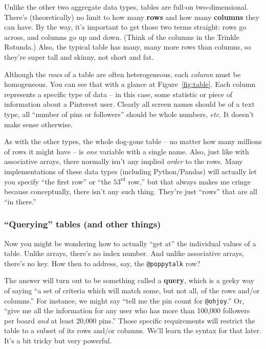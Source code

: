 Unlike the other two aggregate data types, tables are full-on two-dimensional.
There's (theoretically) no limit to how many \textbf{rows} and how many
\textbf{columns} they can have. By the way, it's important to get those two
terms straight: rows go across, and columns go up and down. (Think of the
columns in the Trinkle Rotunda.) Also, the typical table has many, many more
rows than columns, so they're super tall and skinny, not short and fat.

Although the \textit{rows} of a table are often heterogeneous, each
\textit{column} must be homogeneous. You can see that with a glance at
Figure~\ref{fig:table}. Each column represents a specific type of data -- in
this case, some statistic or piece of information about a Pinterest user.
Clearly all screen names should be of a text type, all ``number of pins or
followers'' should be whole numbers, \textit{etc.} It doesn't make sense
otherwise.

\label{assocArraysUnordered}
As with the other types, the whole dog-gone table -- no matter how many
millions of rows it might have -- is \textit{one} variable with a single name.
Also, just like with associative arrays, there normally isn't any implied
\textit{order} to the rows. Many implementations of these data types (including
Python/Pandas) will actually let you specify ``the first row'' or ``the
$53^{\textrm{rd}}$ row,'' but that always makes me cringe because conceptually,
there isn't any such thing. They're just ``rows'' that are all ``in
there.''

\subsubsection{``Querying'' tables (and other things)}

\label{tablesHaveNoKey}

Now you might be wondering how to actually ``get at'' the individual values of
a table. Unlike arrays, there's no index number. And unlike associative arrays,
there's no key. How then to address, say, the \texttt{@poppytalk} row?

The answer will turn out to be something called a \textbf{query}, which is a
geeky way of saying ``a set of criteria which will match some, but not all, of
the rows and/or columns.'' For instance, we might say ``tell me the pin count
for \texttt{@ohjoy}.'' Or, ``give me all the information for any user who has
more than 100,000 followers per board \textit{and} at least 20,000 pins.''
Those specific requirements will restrict the table to a subset of its rows
and/or columns. We'll learn the syntax for that later. It's a bit tricky but
very powerful.

